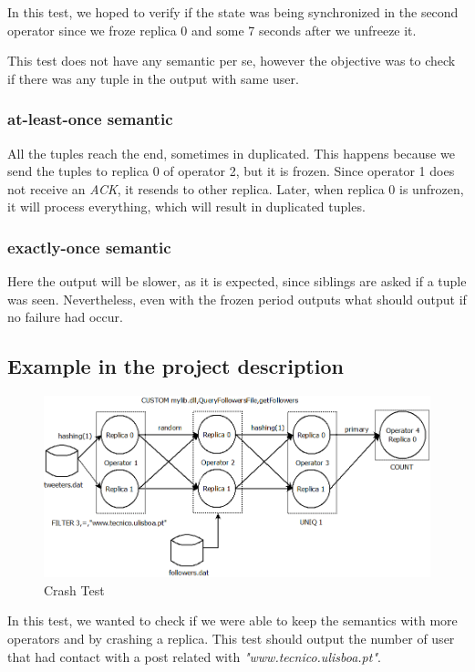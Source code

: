 \documentclass[times, 10pt,twocolumn]{article}
\begin{document}
In this test, we hoped to verify if the state was being synchronized in the second operator since we froze replica 0 and some 7 seconds after we unfreeze it. 

This test does not have any semantic per se, however the objective was to check if there was any tuple in the output with same user.

\subsubsection{at-least-once semantic}
All the tuples reach the end, sometimes in duplicated. This happens because we send the tuples to replica 0 of operator 2, but it is frozen. Since operator 1 does not receive an \textit{ACK}, it resends to other replica. Later, when replica 0 is unfrozen, it will process everything, which will result in duplicated tuples.

\subsubsection{exactly-once semantic}
Here the output will be slower, as it is expected, since siblings are asked if a tuple was seen. Nevertheless, even with the frozen period outputs what should output if no failure had occur.

\subsection{Example in the project description}
\begin{figure}[h]
	\centering
	\includegraphics[scale=0.29]{"Tests/second"}
	\caption{Crash Test} 
	\label{fig:state}
\end{figure}

In this test, we wanted to check if we were able to keep the semantics with more operators and by  crashing a replica. This test should output the number of user that had contact with a post related with \textit{"www.tecnico.ulisboa.pt"}.
\end{document}
